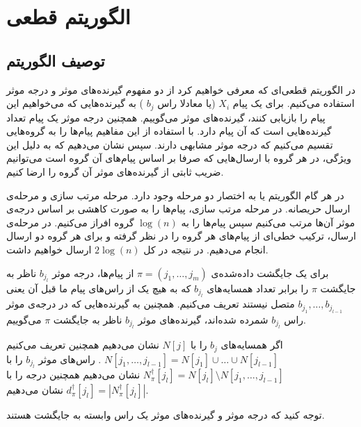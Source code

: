 \section{
	الگوریتم قطعی
	}
	\subsection{
	توصیف الگوریتم
	}

در الگوریتم قطعی‌ای که معرفی خواهیم کرد از دو مفهوم گیرنده‌های موثر و درجه موثر استفاده می‌کنیم. برای یک پیام
$X_i$
(یا معادلا راس
$b_j$
)
به گیرنده‌هایی که می‌خواهیم این پیام را بازیابی کنند، گیرنده‌های موثر می‌گوییم. همچنین درجه موثر یک پیام تعداد گیرنده‌هایی است که آن پیام دارد. با استفاده از این مفاهیم پیام‌ها را به گروه‌هایی تقسیم می‌کنیم که درجه موثر مشابهی دارند. سپس نشان می‌دهیم که به دلیل این ویژگی، در هر گروه با ارسال‌هایی که صرفا بر اساس پیام‌های آن گروه است می‌توانیم ضریب ثابتی از گیرنده‌های موثر آن گروه را ارضا کنیم.

در هر گام الگوریتم
یا به اختصار
دو مرحله وجود دارد. مرحله مرتب سازی و مرحله‌ی ارسال حریصانه. در مرحله مرتب سازی، پیام‌ها را به صورت کاهشی بر اساس درجه‌ی موثر آن‌ها مرتب می‌کنیم سپس پیام‌ها را به 
$\log(n)$
گروه افراز می‌کنیم. در مرحله‌ی ارسال، ترکیب خطی‌ای از پیام‌های هر گروه را در نظر گرفته و برای هر گروه دو ارسال انجام می‌دهیم. در نتیجه در کل
$2 \log(n)$
ارسال خواهیم داشت.

\begin{definition}
	برای یک جایگشت داده‌شده‌ی 
	$\pi = (j_1, \ldots, j_m)$
	از پیام‌ها، درجه موثر
	$b_{j_l}$
	ناظر به جایگشت 
	$\pi$
	را برابر تعداد همسایه‌های 
	$b_{j_l}$
	که به هیچ یک از راس‌‌های پیام ما قبل آن یعنی
	$b_{j_1}, \ldots, b_{j_{l - 1}}$
	متصل نیستند تعریف می‌کنیم. همچنین به گیرنده‌هایی که در درجه‌ی موثر راس
		$b_{j_l}$
		شمرده شده‌اند، گیرنده‌های موثر
		$b_{j_l}$
		 ناظر به جایگشت
		$\pi$
		 می‌گوییم.
		\end{definition}
		\begin{notation}
		 اگر همسایه‌های
		 $b_j$
		 را با
		 $N[j]$
		 نشان می‌دهیم همچنین تعریف می‌کنیم
		 $N[j_1, \ldots, j_{l - 1}] = N[j_1] \cup \ldots \cup N[j_{l - 1}]$
		 . راس‌های موثر
 		$b_{j_l}$
 		را با
 		$N^\dagger_\pi [j_l] = N[j_l] \setminus N[j_1, \ldots, j_{l - 1}]$
 		نشان می‌دهیم همچنین درجه را با
 		$d^\dagger_\pi[j_l] = |N^\dagger_\pi [j_l] |$
 		نشان می‌دهیم.
 	\end{notation}


توجه کنید که درجه موثر و گیرنده‌های موثر یک راس وابسته به جایگشت هستند.

